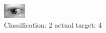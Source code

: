 \begin{figure}[h!]
\begin{center}
\includegraphics[width=0.60\columnwidth]{figures/ID826_class_2_target_4.png}
\end{center}
\caption{ Classification: 2 actual target: 4}
\label{fig:ID826_class_2_target_4}
\end{figure}
